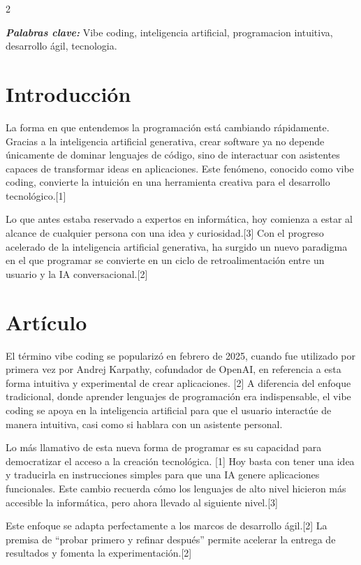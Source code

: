 \documentclass[12pt,spanish,Letterpaper,openany]{book}
\begin{document}
\begin {multicols}{2}

\textbf{\emph{Palabras clave:}} Vibe coding, inteligencia artificial, programacion intuitiva, desarrollo ágil, tecnologia.

\section{Introducción}\label{introducciuxf3n-4}

La forma en que entendemos la programación está cambiando rápidamente. Gracias a la inteligencia artificial generativa, crear software ya no depende únicamente de dominar lenguajes de código, sino de interactuar con asistentes capaces de transformar ideas en aplicaciones. Este fenómeno, conocido como vibe coding, convierte la intuición en una herramienta creativa para el
desarrollo tecnológico.{[}1{]}

Lo que antes estaba reservado a expertos en informática, hoy comienza a estar al alcance de cualquier persona con una idea y curiosidad.{[}3{]} Con el progreso acelerado de la inteligencia artificial generativa, ha surgido un nuevo paradigma en el que programar se convierte en un ciclo de retroalimentación entre un usuario y la IA conversacional.{[}2{]}

\section{Artículo}\label{artuxedculo-4}

\bigskip

El término vibe coding se popularizó en febrero de 2025, cuando fue utilizado por primera vez por Andrej Karpathy, cofundador de OpenAI, en referencia a esta forma intuitiva y experimental de crear aplicaciones. {[}2{]} A diferencia del enfoque tradicional, donde aprender lenguajes de programación era indispensable, el vibe coding se apoya en la inteligencia artificial para que el usuario interactúe de manera intuitiva, casi como si hablara con un asistente personal.

Lo más llamativo de esta nueva forma de programar es su capacidad para democratizar el acceso a la creación tecnológica. {[}1{]} Hoy basta con tener una idea y traducirla en instrucciones simples para que una IA genere aplicaciones funcionales. Este cambio recuerda cómo los lenguajes de alto nivel
hicieron más accesible la informática, pero ahora llevado al siguiente nivel.{[}3{]}

Este enfoque se adapta perfectamente a los marcos de desarrollo ágil.{[}2{]} La premisa de ``probar primero y refinar después'' permite acelerar la entrega de resultados y fomenta la experimentación.{[}2{]}


\end{multicols}
\end{document}
